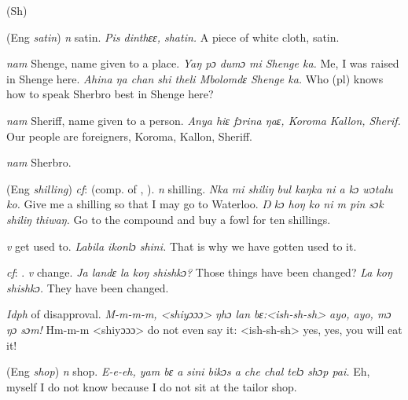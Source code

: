 \begin{letter}{(Sh)}

 (Eng \textit{satin}) \textit{n} satin. \textit{Pis dinthɛɛ, shatin.} A piece of white cloth, satin.

 \textit{nam} Shenge, name given to a place. \textit{Yaŋ pɔ dumɔ mi Shenge ka.} Me, I was raised in Shenge here. \textit{Ahina ŋa chan shi theli Mbolomdɛ Shenge ka.} Who (pl) knows how to speak Sherbro best in Shenge here?

 \textit{nam} Sheriff, name given to a person. \textit{Anya hiɛ fɔrina ŋaɛ, Koroma Kallon, Sherif.} Our people are foreigners, Koroma, Kallon, Sheriff.

 \textit{nam} Sherbro.

 (Eng \textit{shilling}) \textit{cf}:  (comp. of , ). \textit{n} shilling. \textit{Nka mi shiliŋ bul kaŋka ni a kɔ wɔtalu ko.} Give me a shilling so that I may go to Waterloo. \textit{Ŋ kɔ hoŋ ko ni m pin sɔk shiliŋ thiwaŋ.} Go to the compound and buy a fowl for ten shillings.

 \textit{v} get used to. \textit{Labila ikonlɔ shini.} That is why we have gotten used to it.

 \textit{cf}: . \textit{v} change. \textit{Ja landɛ la koŋ shishkɔ?} Those things have been changed? \textit{La koŋ shishkɔ.} They have been changed.

 \textit{Idph} of disapproval. \textit{M-m-m-m, <shiyɔɔɔ> ŋhɔ lan bɛ:<ish-sh-sh> ayo, ayo, mɔ ŋɔ sɔm!} Hm-m-m <shiyɔɔɔ> do not even say it: <ish-sh-sh> yes, yes, you will eat it!

 (Eng \textit{shop}) \textit{n} shop. \textit{E-e-eh, yam bɛ a sini bikɔs a che chal telɔ shɔp pai.} Eh, myself I do not know because I do not sit at the tailor shop.

\end{letter}
